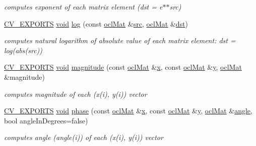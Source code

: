\begin{DoxyCompactItemize}
\begin{DoxyCompactList}\small\item\em computes exponent of each matrix element (dst = e$\ast$$\ast$src) \end{DoxyCompactList}\item 
\hyperlink{core_2types__c_8h_a1bf9f0e121b54272da02379cfccd0a2b}{C\-V\-\_\-\-E\-X\-P\-O\-R\-T\-S} \hyperlink{legacy_8hpp_a8bb47f092d473522721002c86c13b94e}{void} \hyperlink{namespacecv_1_1ocl_a312573b27e6021489b806033fac0a387}{log} (const \hyperlink{classcv_1_1ocl_1_1oclMat}{ocl\-Mat} \&\hyperlink{legacy_8hpp_a371cd109b74033bc4366f584edd3dacc}{src}, \hyperlink{classcv_1_1ocl_1_1oclMat}{ocl\-Mat} \&\hyperlink{photo__c_8h_aed13e2a25279b24dc954073233fef7a5}{dst})
\begin{DoxyCompactList}\small\item\em computes natural logarithm of absolute value of each matrix element\-: dst = log(abs(src)) \end{DoxyCompactList}\item 
\hyperlink{core_2types__c_8h_a1bf9f0e121b54272da02379cfccd0a2b}{C\-V\-\_\-\-E\-X\-P\-O\-R\-T\-S} \hyperlink{legacy_8hpp_a8bb47f092d473522721002c86c13b94e}{void} \hyperlink{namespacecv_1_1ocl_a4145176dccaeb025289e5ede5c21756c}{magnitude} (const \hyperlink{classcv_1_1ocl_1_1oclMat}{ocl\-Mat} \&\hyperlink{highgui__c_8h_a6150e0515f7202e2fb518f7206ed97dc}{x}, const \hyperlink{classcv_1_1ocl_1_1oclMat}{ocl\-Mat} \&\hyperlink{highgui__c_8h_af1202c02b14870c18fb3a1da73e9e7c7}{y}, \hyperlink{classcv_1_1ocl_1_1oclMat}{ocl\-Mat} \&magnitude)
\begin{DoxyCompactList}\small\item\em computes magnitude of each (x(i), y(i)) vector \end{DoxyCompactList}\item 
\hyperlink{core_2types__c_8h_a1bf9f0e121b54272da02379cfccd0a2b}{C\-V\-\_\-\-E\-X\-P\-O\-R\-T\-S} \hyperlink{legacy_8hpp_a8bb47f092d473522721002c86c13b94e}{void} \hyperlink{namespacecv_1_1ocl_acb0c88237e6d30538732bd6ddc42d273}{phase} (const \hyperlink{classcv_1_1ocl_1_1oclMat}{ocl\-Mat} \&\hyperlink{highgui__c_8h_a6150e0515f7202e2fb518f7206ed97dc}{x}, const \hyperlink{classcv_1_1ocl_1_1oclMat}{ocl\-Mat} \&\hyperlink{highgui__c_8h_af1202c02b14870c18fb3a1da73e9e7c7}{y}, \hyperlink{classcv_1_1ocl_1_1oclMat}{ocl\-Mat} \&\hyperlink{imgproc__c_8h_a79dea7ed146af26ff4a0ba4bf5c83eee}{angle}, bool angle\-In\-Degrees=false)
\begin{DoxyCompactList}\small\item\em computes angle (angle(i)) of each (x(i), y(i)) vector \end{DoxyCompactList}\item 

\end{DoxyCompactItemize}
